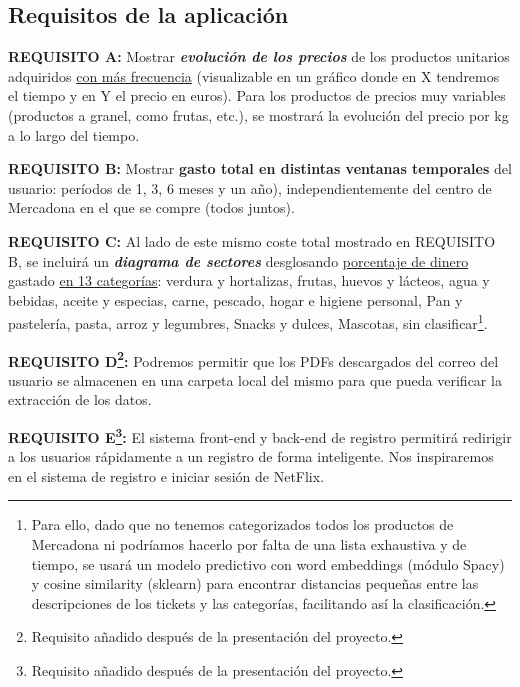 \documentclass[a4paper,12pt]{report}
\begin{document}
		
			\subsection{Requisitos de la aplicación}
			\label{sec:requisitosAplicacion}
			
		

			

			
		
			
			\textbf{REQUISITO A:} Mostrar\textbf{ \textit{evolución de los precios}} de los productos unitarios adquiridos \underline{con más frecuencia} (visualizable en un gráfico donde en X tendremos el tiempo y en Y el precio en euros). Para los productos de precios muy variables (productos a granel, como frutas, etc.), se mostrará la evolución del precio por kg a lo largo del tiempo.
			
			\textbf{REQUISITO B:} Mostrar {\textbf{gasto total en distintas ventanas temporales}} del usuario: períodos de 1, 3, 6 meses y un año), independientemente del centro de Mercadona en el que se compre (todos juntos).
			
			\textbf{REQUISITO C:} Al lado de este mismo coste total mostrado en REQUISITO B, se incluirá un \textbf{\textit{diagrama de sectores}} desglosando \underline{porcentaje de dinero} gastado \underline{en 13 categorías}: verdura y hortalizas, frutas, huevos y lácteos, agua y bebidas, aceite y especias, carne, pescado, hogar e higiene personal, Pan y pastelería, pasta, arroz y legumbres, Snacks y dulces, Mascotas, sin clasificar\footnote{Para ello, dado que no tenemos categorizados todos los productos de Mercadona ni podríamos hacerlo por falta de una lista exhaustiva y de tiempo, se usará un modelo predictivo con word embeddings (módulo Spacy) y cosine similarity (sklearn) para encontrar distancias pequeñas entre las descripciones de los tickets y las categorías, facilitando así la clasificación.}.
			
			
			\textbf{REQUISITO D\footnote{Requisito añadido después de la presentación del proyecto.}:} Podremos permitir que los PDFs descargados del correo del usuario se almacenen en una carpeta local del mismo para que pueda verificar la extracción de los datos.
			
			\textbf{REQUISITO E\footnote{Requisito añadido después de la presentación del proyecto.}:} El sistema front-end y back-end de registro permitirá redirigir a los usuarios rápidamente a un registro de forma inteligente. Nos inspiraremos en el sistema de  registro e iniciar sesión de NetFlix.
			
\end{document}
